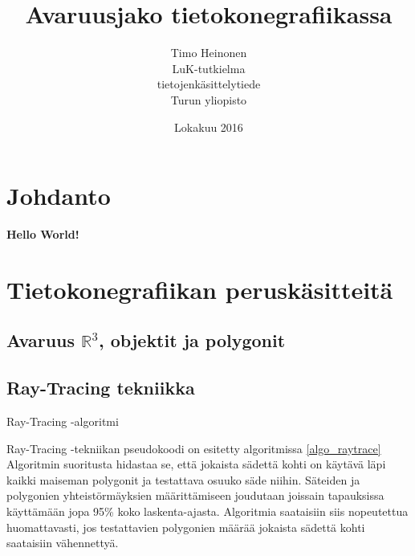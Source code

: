\documentclass[a4paper,12pt, titlepage]{article}
\title{Avaruusjako tietokonegrafiikassa}
\author{Timo Heinonen \\LuK-tutkielma \\ tietojenkäsittelytiede \\ Turun yliopisto}
\date{Lokakuu 2016}
\theoremstyle{break}
\theoremstyle{algostyle}
\newcommand{\R}{\mathbb{R}}
\begin{document}
\maketitle

\setcounter{tocdepth}{2} %
\tableofcontents
\listofalgorithms

\newpage
\section{Johdanto}
\textbf{Hello World!}

\section{Tietokonegrafiikan peruskäsitteitä}
\subsection{Avaruus $\R ^3$, objektit ja polygonit} 
\subsection{Ray-Tracing tekniikka}

\begin{algorithm}
\caption{Ray-Tracing -algoritmi}\label{algo_raytrace}
\end{algorithm}

Ray-Tracing -tekniikan pseudokoodi on esitetty algoritmissa \ref{algo_raytrace}\\

Algoritmin suoritusta hidastaa se, että jokaista sädettä kohti on käytävä läpi kaikki maiseman polygonit ja testattava osuuko säde niihin. Säteiden ja polygonien yhteistörmäyksien määrittämiseen joudutaan joissain tapauksissa käyttämään jopa 95\% koko laskenta-ajasta.\cite{whitted} Algoritmia saataisiin siis nopeutettua huomattavasti, jos testattavien polygonien määrää jokaista sädettä kohti saataisiin vähennettyä. 
\end{document}
